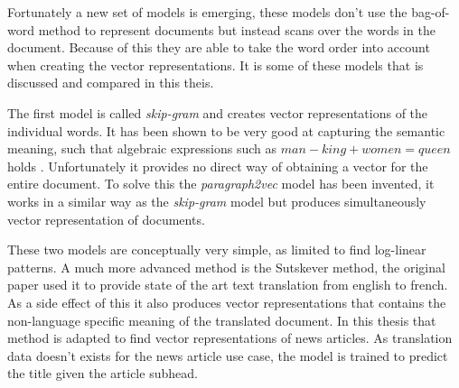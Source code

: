 Fortunately a new set of models is emerging, these models don't use the bag-of-word method to represent documents but instead scans over the words in the document. Because of this they are able to take the word order into account when creating the vector representations. It is some of these models that is discussed and compared in this theis.

The first model is called \textit{skip-gram} and creates vector representations of the individual words. It has been shown to be very good at capturing the semantic meaning, such that algebraic expressions such as $man - king + women = queen$ holds \cite{word2vec-comparing, word2vec-details}. Unfortunately it provides no direct way of obtaining a vector for the entire document. To solve this the \textit{paragraph2vec} model has been invented, it works in a similar way as the \textit{skip-gram} model but produces simultaneously vector representation of documents.

These two models are conceptually very simple, as limited to find log-linear patterns. A much more advanced method is the Sutskever method, the original paper \cite{sutskever} used it to provide state of the art text translation from english to french. As a side effect of this it also produces vector representations that contains the non-language specific meaning of the translated document. In this thesis that method is adapted to find vector representations of news articles. As translation data doesn't exists for the news article use case, the model is trained to predict the title given the article subhead.
